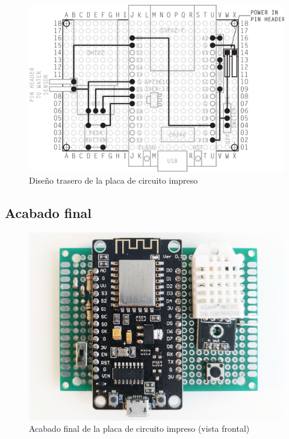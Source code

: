 \vfill

\clearpage

\begin{figure}
  \centering
  \includegraphics[width=1\columnwidth]{../design/exterior-board-back}
  \caption{Diseño trasero de la placa de circuito impreso}
  \label{fig:exterior-board-back}
\end{figure}

\clearpage

\subsection{Acabado final}

\vfill

\begin{figure}[H]
  \centering
  \includegraphics[width=1\columnwidth]{../photos/exterior-pcb-front}
  \caption{Acabado final de la placa de circuito impreso (vista frontal)}
  \label{fig:exterior-pcb-front}
\end{figure}


